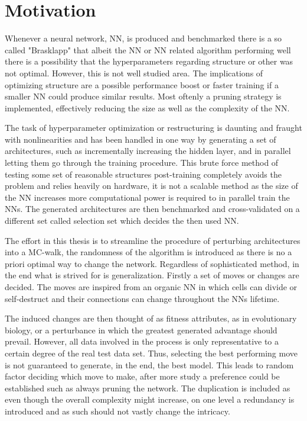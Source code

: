 \section{Motivation}

Whenever a neural network, NN, is produced and benchmarked there is a so called "Brasklapp" that albeit the NN or NN related algorithm performing well there is a possibility that the hyperparameters regarding structure or other was not optimal. However, this is not well studied area. The implications of optimizing structure are a possible performance boost or faster training if a smaller NN could produce similar results. Most oftenly a pruning strategy is implemented, effectively reducing the size as well as the complexity of the NN.  

The task of hyperparameter optimization or restructuring is daunting and fraught with nonlinearities and has been handled in one way by generating a set of architectures, such as incrementally increasing the hidden layer, and in parallel letting them go through the training procedure. This brute force method of testing some set of reasonable structures post-training completely avoids the problem and relies heavily on hardware, it is not a scalable method as the size of the NN increases more computational power is required to in parallel train the NNs. The generated architectures are then benchmarked and cross-validated on a different set called selection set which decides the then used NN. 

The effort in this thesis is to streamline the procedure of perturbing architectures into a MC-walk, the randomness of the algorithm is introduced as there is no a priori optimal way to change the network. Regardless of sophisticated method, in the end what is strived for is generalization. Firstly a set of moves or changes are decided. The moves are inspired from an organic NN in which cells can divide or self-destruct and their connections can change throughout the NNs lifetime. 

The induced changes are then thought of as fitness attributes, as in evolutionary biology, or a perturbance in which the greatest generated advantage should prevail. However, all data involved in the process is only representative to a certain degree of the real test data set. Thus, selecting the best performing move is not guaranteed to generate, in the end, the best model. This leads to random factor deciding which move to make, after more study a preference could be established such as always pruning the network. The duplication is included as even though the overall complexity might increase, on one level a redundancy is introduced and as such should not vastly change the intricacy. 

